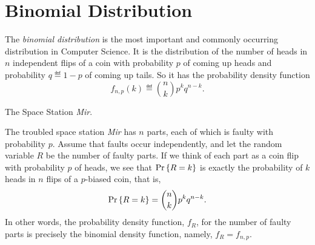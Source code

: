 \documentclass[11pt,twoside]{article}
\begin{document}
\section{Binomial Distribution}

The \emph{binomial distribution} is the most important and commonly
occurring distribution in Computer Science.  It is the distribution of the
number of heads in $n$ independent flips of a coin with probability $p$ of
coming up heads and probability $q \eqdef 1 -p$ of coming up tails.  So it
has the probability density function
\[
f_{n,p}(k) \eqdef \binom{n}{k} p^k q^{n-k}.
\]

\begin{example} The Space Station \emph{Mir}.

The troubled space station \emph{Mir} has $n$ parts, each of which is
faulty with probability $p$.  Assume that faults occur independently, and
let the random variable $R$ be the number of faulty parts.  If we think of
each part as a coin flip with probability $p$ of heads, we see that $\mathop{\textup{Pr}}\nolimits\left\{R
= k\right\}$ is exactly the probability of $k$ heads in $n$ flips of a $p$-biased
coin, that is,
\[
\mathop{\textup{Pr}}\nolimits\left\{R = k\right\} = \binom{n}{k} p^k q^{n-k}.
\]
In other words, the probability density function, $f_R$, for the number of
faulty parts is precisely the binomial density function, namely, $f_R =
f_{n,p}$.

\end{example}

\end{document}
